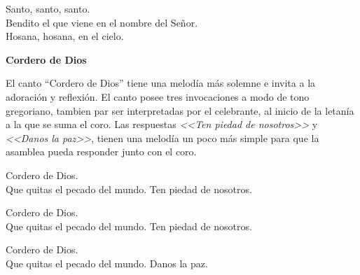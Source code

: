 \documentclass[12pt, letterpaper]{report}
\begin{document}
    \noindent
    Santo, santo, santo. \\
    Bendito el que viene en el nombre del Se\~nor. \\
    Hosana, hosana, en el cielo.
    \clearpage



    
    \begin{center}
        \Huge {\bfseries Cordero de Dios}
    \end{center}

    \Large El canto ``Cordero de Dios'' tiene una melod\'ia m\'as solemne e invita a la adoraci\'on y reflexi\'on. El canto posee tres invocaciones a modo de tono gregoriano, tambien par ser interpretadas por el celebrante, al inicio de la letan\'ia a la que se suma el coro. Las respuestas \textit{<<Ten piedad de nosotros>>} y \textit{<<Danos la paz>>}, tienen una melod\'ia un poco m\'as simple para que la asamblea pueda responder junto con el coro.

    \noindent
    \LARGE Cordero de Dios.\\
    Que quitas el pecado del mundo. Ten piedad de nosotros.

    \noindent
    \LARGE Cordero de Dios.\\
    Que quitas el pecado del mundo. Ten piedad de nosotros.

    \noindent
    \LARGE Cordero de Dios.\\
    Que quitas el pecado del mundo. Danos la paz.
    \clearpage


\end{document}
